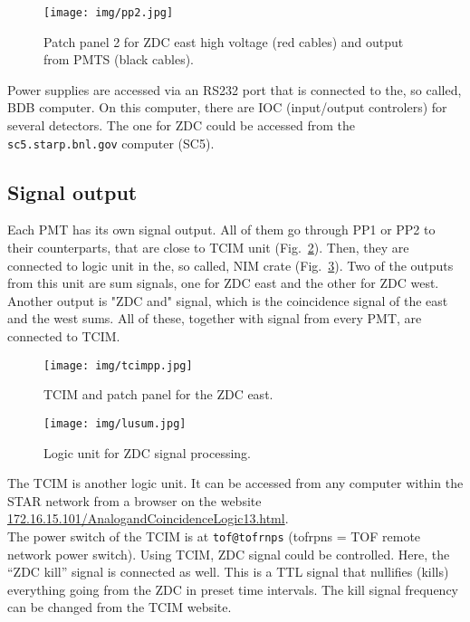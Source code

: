 \begin{figure}[htb]
\begin{center}
\texttt{[image: img/pp2.jpg]}
\end{center}
\caption{Patch panel 2 for ZDC east high voltage (red cables) and output from PMTS (black cables).}
\label{pp2}
\end{figure}

Power supplies are accessed via an RS232 port that is connected to the, so called, BDB computer. On this computer, there are IOC (input/output controlers) for several detectors. The one for ZDC could be accessed from the \texttt{sc5.starp.bnl.gov} computer (SC5).

\subsection{Signal output}

Each PMT has its own signal output. All of them go through PP1 or PP2 to their counterparts, that are close to TCIM unit (Fig.~\ref{tcimpp}). Then, they are connected to logic unit in the, so called, NIM crate (Fig.~\ref{lu_sum}). Two of the outputs from this unit are sum signals, one for ZDC east and the other for ZDC west. Another output is "ZDC and" signal, which is the coincidence signal of the east and the west sums. All of these, together with signal from every PMT, are connected to TCIM.

\begin{figure}[htb]
\begin{center}
\texttt{[image: img/tcimpp.jpg]}
\end{center}
\caption{TCIM and patch panel for the ZDC east.}
\label{tcimpp}
\end{figure}


\begin{figure}[htb]
\begin{center}
\texttt{[image: img/lusum.jpg]}
\end{center}
\caption{Logic unit for ZDC signal processing.}
\label{lu_sum}
\end{figure}

The TCIM is another logic unit.  It can be accessed from any  computer within the STAR network
from a browser on the website\\ 
\url{172.16.15.101/AnalogandCoincidenceLogic13.html}.\\
The power switch of the TCIM is at \texttt{tof@tofrnps} (tofrpns = TOF remote network power switch).
Using TCIM, ZDC signal could be controlled. Here, the ``ZDC kill'' signal is connected as well. This is a TTL signal that nullifies (kills) everything going from the ZDC in preset time intervals. The
kill signal frequency can be changed from the TCIM website.

